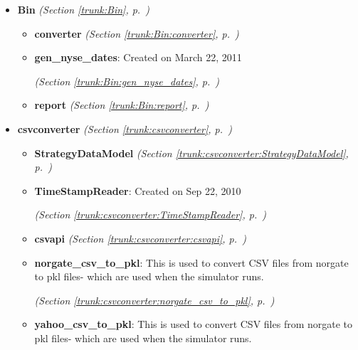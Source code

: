 \begin{itemize}
\setlength{\parskip}{0ex}
\item \textbf{Bin}
  \textit{(Section \ref{trunk:Bin}, p.~\pageref{trunk:Bin})}

  \begin{itemize}
\setlength{\parskip}{0ex}
    \item \textbf{converter}
  \textit{(Section \ref{trunk:Bin:converter}, p.~\pageref{trunk:Bin:converter})}

    \item \textbf{gen\_nyse\_dates}: Created on March 22, 2011



  \textit{(Section \ref{trunk:Bin:gen_nyse_dates}, p.~\pageref{trunk:Bin:gen_nyse_dates})}

    \item \textbf{report}
  \textit{(Section \ref{trunk:Bin:report}, p.~\pageref{trunk:Bin:report})}

  \end{itemize}
\item \textbf{csvconverter}
  \textit{(Section \ref{trunk:csvconverter}, p.~\pageref{trunk:csvconverter})}

  \begin{itemize}
\setlength{\parskip}{0ex}
    \item \textbf{StrategyDataModel}
  \textit{(Section \ref{trunk:csvconverter:StrategyDataModel}, p.~\pageref{trunk:csvconverter:StrategyDataModel})}

    \item \textbf{TimeStampReader}: Created on Sep 22, 2010



  \textit{(Section \ref{trunk:csvconverter:TimeStampReader}, p.~\pageref{trunk:csvconverter:TimeStampReader})}

    \item \textbf{csvapi}
  \textit{(Section \ref{trunk:csvconverter:csvapi}, p.~\pageref{trunk:csvconverter:csvapi})}

    \item \textbf{norgate\_csv\_to\_pkl}: This is used to convert CSV files from norgate to pkl files- which are used
when the simulator runs.



  \textit{(Section \ref{trunk:csvconverter:norgate_csv_to_pkl}, p.~\pageref{trunk:csvconverter:norgate_csv_to_pkl})}

    \item \textbf{yahoo\_csv\_to\_pkl}: This is used to convert CSV files from norgate to pkl files- which are used
when the simulator runs.




\end{itemize}
\end{itemize}
